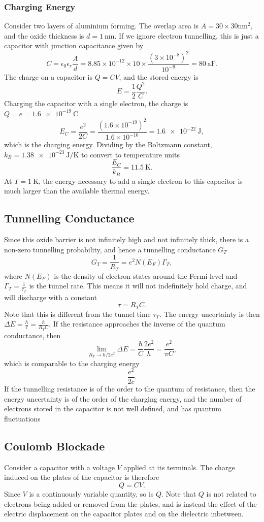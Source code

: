 \documentclass{article}
\begin{document}
\subsubsection{Charging Energy}
Consider two layers of aluminium forming. The overlap area is $A=30\times 30 \unit{\nano\metre}^2,$ and the oxide thickness is $d=\SI{1}{\nano\metre}$. If we ignore electron tunnelling, this is just a capacitor with junction capacitance given by 
\[
    C=\epsilon _0\epsilon _r \frac{A}{d}=8.85\times 10^{-12}\times 10 \times \frac{\left( 3\times 10^{-8} \right)^2}{10^{-9}}=\SI{80}{\atto\farad}.
\]
The charge on a capacitor is $Q=CV$, and the stored energy is 
\[
    E=\frac{1}{2}\frac{Q^2}{C}.
\]
Charging the capacitor with a single electron, the charge is $Q=e=\SI{1.6e-19}{\coulomb}$ 
\[
    E_C=\frac{e^2}{2C}=\frac{\left( 1.6\times 10^{-19} \right)^2}{1.6\times 10^{-16}}=\SI{1.6e-22}{\joule},
\]
which is the charging energy. Dividing by the Boltzmann constant, $k_B=\SI{1.38e-23}{\joule\per\kelvin}$ to convert to temperature units 
\[
    \frac{E_C}{k_B}=\SI{11.5}{\kelvin}.
\]
At $T=\SI{1}{\kelvin}$, the energy necessary to add a single electron to this capacitor is much larger than the available thermal energy.

\subsection{Tunnelling Conductance}
Since this oxide barrier is not infinitely high and not infinitely thick, there is a non-zero tunnelling probability, and hence a tunnelling conductance $G_T$ 
\[
    G_T=\frac{1}{R_T}=e^2N(E_F)\Gamma  _T,
\]
where $N(E_F)$ is the density of electron states around the Fermi level and $\Gamma _T=\frac{1}{\tau _T}$ is the tunnel rate. This means it will not indefinitely hold charge, and will discharge with a constant 
\[
    \tau =R_TC.
\]
Note that this is different from the tunnel time $\tau _T$. The energy uncertainty is then $\Delta E=\frac{\hbar }{\tau }=\frac{\hbar }{R_TC}$. If the resistance approaches the inverse of the quantum conductance, then 
\[
    \lim_{R_T\to \hbar/2e^2 } \Delta E=\frac{\hbar }{C}\frac{2e^2}{h}=\frac{e^2}{\pi C},
\]
which is comparable to the charging energy 
\[
    \frac{e^2}{2c}.
\]
If the tunnelling resistance is of the order to the quantum of resistance, then the energy uncertainty is of the order of the charging energy, and the number of electrons stored in the capacitor is not well defined, and has quantum fluctuations

\subsection{Coulomb Blockade}
Consider a capacitor with a voltage $V$ applied at its terminals. The charge induced on the plates of the capacitor is therefore 
\[
    Q=CV.
\]
Since $V$ is a continuously variable quantity, so is $Q$. Note that $Q$ is not related to electrons being added or removed from the plates, and is instead the effect of the electric displacement on the capacitor plates and on the dielectric inbetween.
\end{document}
